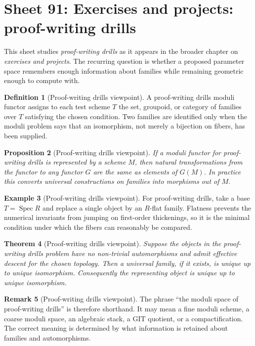 \documentclass[11pt]{amsart}
\newtheorem{theorem}{Theorem}[section]
\newtheorem{proposition}[theorem]{Proposition}
\theoremstyle{definition}
\newtheorem{definition}[theorem]{Definition}
\newtheorem{example}[theorem]{Example}
\newtheorem{remark}[theorem]{Remark}
\newcommand{\Spec}{\operatorname{Spec}}
\begin{document}
\section{Sheet 91: Exercises and projects: proof-writing drills}
This sheet studies \emph{proof-writing drills} as it appears in the broader chapter on \emph{exercises and projects}.  The recurring question is whether a proposed parameter space remembers enough information about families while remaining geometric enough to compute with.
\begin{definition}[Proof-writing drills viewpoint]
A proof-writing drills moduli functor assigns to each test scheme $T$ the set, groupoid, or category of families over $T$ satisfying the chosen condition.  Two families are identified only when the moduli problem says that an isomorphism, not merely a bijection on fibers, has been supplied.
\end{definition}
\begin{proposition}[Proof-writing drills viewpoint]
If a moduli functor for proof-writing drills is represented by a scheme $M$, then natural transformations from the functor to any functor $G$ are the same as elements of $G(M)$.  In practice this converts universal constructions on families into morphisms out of $M$.
\end{proposition}
\begin{example}[Proof-writing drills viewpoint]
For proof-writing drills, take a base $T=\Spec R$ and replace a single object by an $R$-flat family.  Flatness prevents the numerical invariants from jumping on first-order thickenings, so it is the minimal condition under which the fibers can reasonably be compared.
\end{example}
\begin{theorem}[Proof-writing drills viewpoint]
Suppose the objects in the proof-writing drills problem have no non-trivial automorphisms and admit effective descent for the chosen topology.  Then a universal family, if it exists, is unique up to unique isomorphism.  Consequently the representing object is unique up to unique isomorphism.
\end{theorem}
\begin{remark}[Proof-writing drills viewpoint]
The phrase ``the moduli space of proof-writing drills'' is therefore shorthand.  It may mean a fine moduli scheme, a coarse moduli space, an algebraic stack, a GIT quotient, or a compactification.  The correct meaning is determined by what information is retained about families and automorphisms.
\end{remark}
\end{document}
